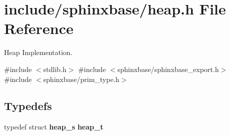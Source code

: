 \section{include/sphinxbase/heap.h File Reference}
\label{heap_8h}


Heap Implementation.  


{\ttfamily \#include $<$stdlib.\+h$>$}\newline
{\ttfamily \#include $<$sphinxbase/sphinxbase\+\_\+export.\+h$>$}\newline
{\ttfamily \#include $<$sphinxbase/prim\+\_\+type.\+h$>$}\newline
\subsection*{Typedefs}
\begin{DoxyCompactItemize}
\item 
\mbox{\label{heap_8h_a0ffa4ec8648c254bf19eee352b69dc7a}} 
typedef struct \textbf{ heap\+\_\+s} {\bfseries heap\+\_\+t}
\end{DoxyCompactItemize}
